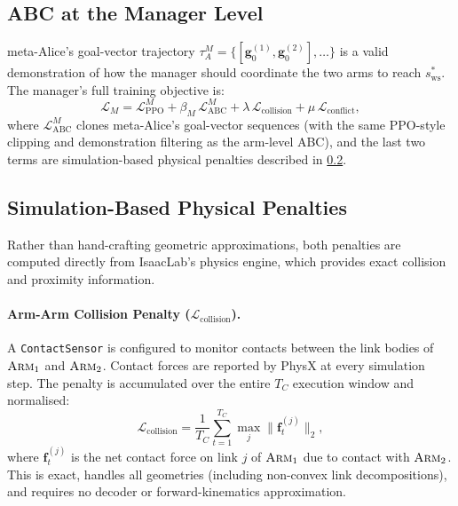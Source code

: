 \documentclass[12pt, a4paper]{article}
\newcommand{\sstar}{s^{*}}
\newcommand{\goalvec}{\mathbf{g}}
\newcommand{\calL}{\mathcal{L}}
\newcommand{\arm}[1]{\textsc{Arm}_{#1}}
\begin{document}
\subsection{ABC at the Manager Level}
\label{subsec:abc_manager}

meta-Alice's goal-vector trajectory $\tau_A^M = \{[\goalvec_0^{(1)}, \goalvec_0^{(2)}], \ldots\}$
is a valid demonstration of how the manager should coordinate the two arms to reach
$\sstar_{\mathrm{ws}}$. The manager's full training objective is:
\begin{equation}
    \calL_M = \calL_{\mathrm{PPO}}^M + \beta_M\, \calL_{\mathrm{ABC}}^M
              + \lambda\, \calL_{\mathrm{collision}} + \mu\, \calL_{\mathrm{conflict}},
    \label{eq:manager_loss}
\end{equation}
where $\calL_{\mathrm{ABC}}^M$ clones meta-Alice's goal-vector sequences (with the same
PPO-style clipping and demonstration filtering as the arm-level ABC), and the last two
terms are simulation-based physical penalties described in \cref{sec:penalties}.

\subsection{Simulation-Based Physical Penalties}
\label{sec:penalties}

Rather than hand-crafting geometric approximations, both penalties are computed directly
from IsaacLab's physics engine, which provides exact collision and proximity information.

\paragraph{Arm-Arm Collision Penalty ($\calL_{\mathrm{collision}}$).}
A \texttt{ContactSensor} is configured to monitor contacts between the link bodies of
$\arm{1}$ and $\arm{2}$. Contact forces are reported by PhysX at every simulation step.
The penalty is accumulated over the entire $T_C$ execution window and normalised:
\begin{equation}
    \calL_{\mathrm{collision}} = \frac{1}{T_C} \sum_{t=1}^{T_C}
        \max_j \|\mathbf{f}_t^{(j)}\|_2,
    \label{eq:collision_penalty}
\end{equation}
where $\mathbf{f}_t^{(j)}$ is the net contact force on link $j$ of $\arm{1}$ due to
contact with $\arm{2}$. This is exact, handles all geometries (including non-convex
link decompositions), and requires no decoder or forward-kinematics approximation.
\end{document}
